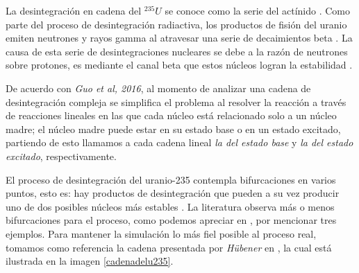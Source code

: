 La desintegración en cadena  del $^{235} U$ se conoce como la serie del actínido \cite{Podgorsak.2016}. Como parte del proceso de desintegración radiactiva, los productos de fisión del uranio emiten neutrones y rayos gamma al atravesar una serie de decaimientos beta \cite{Guo.2016}. La causa de esta serie de desintegraciones nucleares se debe a la razón de neutrones sobre protones, es mediante el canal beta que estos núcleos logran la estabilidad \cite{Guo.2016}. 

De acuerdo con \textit{Guo et al, 2016}, al momento de analizar una cadena de desintegración compleja se simplifica el problema al resolver la reacción a través de reacciones lineales en las que cada núcleo está relacionado solo a un núcleo madre; el núcleo madre puede estar en su estado base o en un estado excitado, partiendo de esto llamamos a cada cadena lineal \textit{la del estado base} y \textit{la del estado excitado}, respectivamente.

El proceso de desintegración del uranio-235 contempla bifurcaciones en varios puntos, esto es: hay productos de desintegración que pueden a su vez producir uno de dos posibles núcleos más estables \cite{HUBENER2003211, International_Atomic_Energy_Agency2013-bq}. La literatura observa más o menos bifurcaciones para el proceso, como podemos apreciar en \cite{HUBENER2003211,International_Atomic_Energy_Agency2013-bq,Pratiwi.2021,Loch.2013}, por mencionar tres ejemplos. Para mantener la simulación lo más fiel posible al proceso real, tomamos como referencia la cadena presentada por \textit{Hübener} en \cite{HUBENER2003211}, la cual está ilustrada en la imagen \ref{cadenadelu235}.

